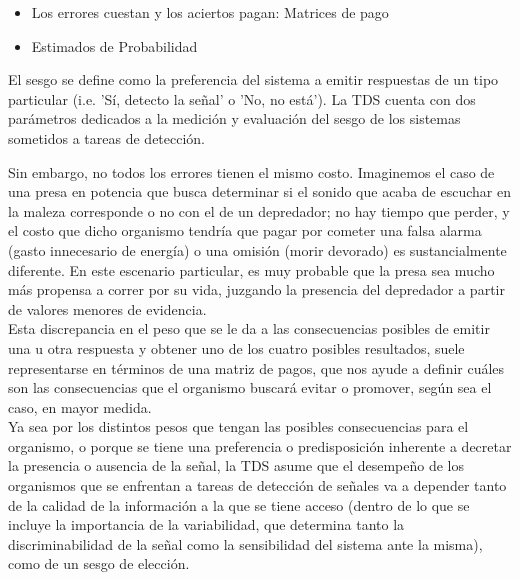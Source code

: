 \begin{itemize}
    \begin{itemize}
      \item{Los errores cuestan y los aciertos pagan: Matrices de pago}\\

      \item{Estimados de Probabilidad}

     \end{itemize}

El sesgo se define como la preferencia del sistema a emitir respuestas de un tipo particular (i.e. 'Sí, detecto la señal' o 'No, no está'). La TDS cuenta con dos parámetros dedicados a la medición y evaluación del sesgo de los sistemas sometidos a tareas de detección.

Sin embargo, no todos los errores tienen el mismo costo. Imaginemos el caso de una presa en potencia que busca determinar si el sonido que acaba de escuchar en la maleza corresponde o no con el de un depredador; no hay tiempo que perder, y el costo que dicho organismo tendría que pagar por cometer una falsa alarma (gasto innecesario de energía) o una omisión (morir devorado) es sustancialmente diferente. En este escenario particular, es muy probable que la presa sea mucho más propensa a correr por su vida, juzgando la presencia del depredador a partir de valores menores de evidencia.\\

Esta discrepancia en el peso que se le da a las consecuencias posibles de emitir una u otra respuesta y obtener uno de los cuatro posibles resultados, suele representarse en términos de una matriz de pagos, que nos ayude a definir cuáles son las consecuencias que el organismo buscará evitar o promover, según sea el caso, en mayor medida.\\

Ya sea por los distintos pesos que tengan las posibles consecuencias para el organismo, o porque se tiene una preferencia o predisposición inherente a decretar la presencia o ausencia de la señal, la TDS asume que el desempeño de los organismos que se enfrentan a tareas de detección de señales va a depender tanto de la calidad de la información a la que se tiene acceso (dentro de lo que se incluye la importancia de la variabilidad, que determina tanto la discriminabilidad de la señal como la sensibilidad del sistema ante la misma), como de un sesgo de elección.\\


\end{itemize}
